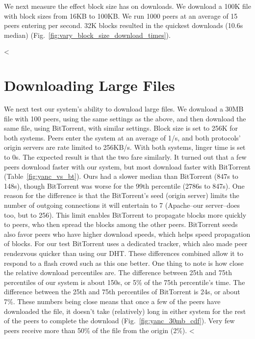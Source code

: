 We next measure the effect block size has on downloads. We download a 100K file with block sizes from 
16KB to 100KB. We run 1000 peers at an average of 15 peers entering per second. 32K blocks resulted 
in the quickest downloads (10.6s median) (Fig.~\ref{fig:vary_block_size_download_times}). 


<%

\section{Downloading Large Files}

We next test our system's ability to download large files. We download a 30MB file with 100 peers, 
using the same settings as the above, and then download the same file, using BitTorrent, with similar 
settings. Block size is set to 256K for both systems. Peers enter the system at an average of 1/s, 
and both protocols' origin servers are rate limited to 256KB/s. With both systems, linger time 
is set to 0s. The expected result is that the two fare similarly. It turned out that a few peers download 
faster with our system, but most download faster with BitTorrent (Table~\ref{fig:yanc_vs_bt}). 
Ours had a slower median than BitTorrent (847s to 148s), though BitTorrent was worse for the 99th 
percentile (2786s to 847s). One reason for the difference is that the BitTorrent's seed (origin 
server) limits the number of outgoing connections it will entertain to 7 (Apache--our server--does 
too, but to 256). This limit enables BitTorrent to propagate blocks more quickly to peers, who then 
spread the blocks among the other peers. BitTorrent seeds also favor peers who have higher download 
speeds, which helps speed propagation of blocks. For our test BitTorrent uses a dedicated tracker, 
which also made peer rendezvous quicker than using our DHT. These differences combined allow it 
to respond to a flash crowd such as this one better. One thing to note is how close the relative download 
percentiles are. The difference between 25th and 75th percentiles of our system is about 150s, 
or 5\% of the 75th percentile's time. The difference between the 25th and 75th percentiles of BitTorrent 
is 24s, or about 7\%. These numbers being close means that once a few of the peers have downloaded 
the file, it doesn't take (relatively) long in either system for the rest of the peers to complete 
the download (Fig.~\ref{fig:yanc_30mb_cdf}). Very few peers receive more than 50\% of the file 
from the origin (2\%). 
<%

